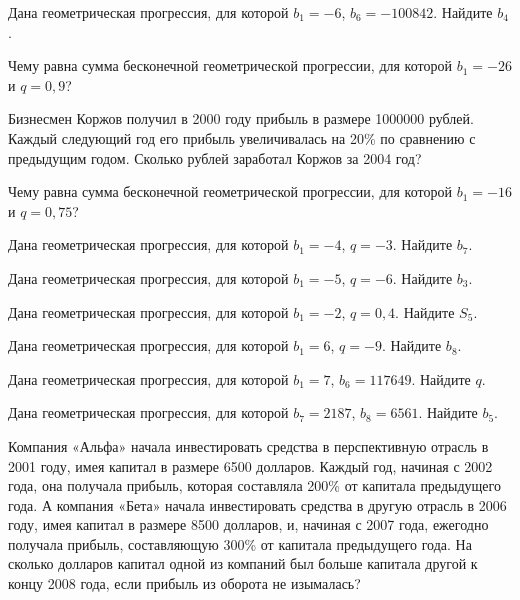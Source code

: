 \documentclass[4apaper]{article}
\begin{document}
\begin{taskBN}{72}
Дана геометрическая прогрессия, для которой $b_1 = -6$, $b_{6}=-100842$. Найдите $b_{4}$.
\end{taskBN}

\begin{taskBN}{73}
Чему равна сумма бесконечной геометрической прогрессии, для которой $b_1 = -26$ и $q=0,9$?
\end{taskBN}

\begin{taskBN}{74}
Бизнесмен Коржов получил в 2000 году прибыль в размере 1000000 рублей. Каждый следующий год его прибыль увеличивалась на 20\% по сравнению с предыдущим годом. Сколько рублей заработал Коржов за 2004 год?
\end{taskBN}

\begin{taskBN}{75}
Чему равна сумма бесконечной геометрической прогрессии, для которой $b_1 = -16$ и $q=0,75$?
\end{taskBN}

\begin{taskBN}{76}
Дана геометрическая прогрессия, для которой $b_1 = -4$, $q=-3$. Найдите $b_{7}$.
\end{taskBN}

\begin{taskBN}{77}
Дана геометрическая прогрессия, для которой $b_1 = -5$, $q=-6$. Найдите $b_{3}$.
\end{taskBN}

\begin{taskBN}{78}
Дана геометрическая прогрессия, для которой $b_1 = -2$, $q=0,4$. Найдите $S_{5}$.
\end{taskBN}

\begin{taskBN}{79}
Дана геометрическая прогрессия, для которой $b_1 = 6$, $q=-9$. Найдите $b_{8}$.
\end{taskBN}

\begin{taskBN}{80}
Дана геометрическая прогрессия, для которой $b_1 = 7$, $b_{6}=117649$. Найдите $q$.
\end{taskBN}

\begin{taskBN}{81}
Дана геометрическая прогрессия, для которой $b_{7} = 2187$, $b_{8}=6561$. Найдите $b_{5}$.
\end{taskBN}

\begin{taskBN}{82}
Компания «Альфа» начала инвестировать средства в перспективную отрасль в 2001 году, имея капитал в размере 6500 долларов. Каждый год, начиная с 2002 года, она получала прибыль, которая составляла 200\% от капитала предыдущего года. А компания «Бета» начала инвестировать средства в другую отрасль в 2006 году, имея капитал в размере 8500 долларов, и, начиная с 2007 года, ежегодно получала прибыль, составляющую 300\% от капитала предыдущего года. На сколько долларов капитал одной из компаний был больше капитала другой к концу 2008 года, если прибыль из оборота не изымалась?
\end{taskBN}
\end{document}
